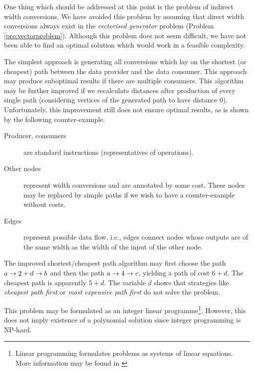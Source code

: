 \label{sec:shortpaths}

One thing which should be addressed at this point is the problem of indirect width conversions. We have avoided this problem by assuming that direct width conversions always exist in the \emph{vectorised generator} problem (Problem \ref{pro:vectorproblem}).  Although this problem does not seem difficult, we have not been able to find an optimal solution which would work in a feasible complexity. 

The simplest approach is generating all conversions which lay on the shortest (or cheapest) path between the data provider and the data consumer. This approach may produce suboptimal results if there are multiple consumers. This algorithm may be further improved if we recalculate distances after production of every single path (considering vertices of the generated path to have distance 0). Unfortunately, this improvement still does not ensure optimal results, as is shown by the following counter-example.


\begin{description}
  \item[Producer, consumers] are standard instructions (representatives of operations).
  \item[Other nodes] represent width conversions and are annotated by some cost. These nodes may be replaced by simple paths if we wish to have a counter-example without costs.
  \item[Edges] represent possible data flow, i.e., edges connect nodes whose outputs are of the same width as the width of the input of the other node.
  \end{description}

The improved shortest/cheapest path algorithm may first choose the path $ a \rightarrow 2 + d \rightarrow b $ and then the path $ a \rightarrow 4 \rightarrow c $, yielding a path of cost $6+d$. The cheapest path is apparently $5+d$. The variable $d$ shows that strategies like \emph{cheapest path first} or \emph{most expensive path first} do not solve the problem.

This problem may be formulated as an integer linear programme\footnote{Linear programming formulates problems as systems of linear equations. More information may be found in \cite{ilp}}. However, this does not imply existence of a polynomial solution since integer programming is NP-hard. 

